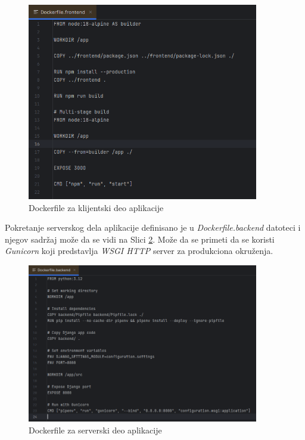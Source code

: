 \documentclass[12pt,oneside]{memoir}
\begin{document}
\begin{figure}[h]
\centering
\includegraphics[width=0.9\textwidth]{images/docker_frontend.png}
\caption{Dockerfile za klijentski deo aplikacije}
\label{fig:docker_frontend}
\end{figure}

Pokretanje serverskog dela aplikacije definisano je u \emph{Dockerfile.backend} datoteci i njegov sadržaj može da se vidi na Slici \ref{fig:docker_backend}. Može da se primeti da se koristi \emph{Gunicorn} koji predstavlja \emph{WSGI HTTP} server za produkciona okruženja.

\begin{figure}[H]
\centering
\includegraphics[width=0.9\textwidth]{images/docker_backend.png}
\caption{Dockerfile za serverski deo aplikacije}
\label{fig:docker_backend}
\end{figure}
\end{document}
